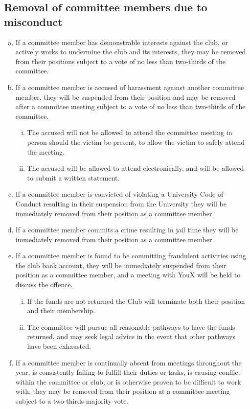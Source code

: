 \documentclass[11pt]{article}
\begin{document}
\subsection{Removal of committee members due to misconduct}
\begin{enumerate}[(a)]
    \item If a committee member has demonstrable interests against the club, or actively works to undermine the club and its interests, they may be removed from their positions subject to a vote of no less than two-thirds of the committee.
    \item If a committee member is accused of harassment against another committee member, they will be suspended from their position and may be removed after a committee meeting subject to a vote of no less than two-thirds of the committee. 
    \begin{enumerate}[(i)]
        \item The accused will not be allowed to attend the committee meeting in person should the victim be present, to allow the victim to safely attend the meeting.
        \item The accused will be allowed to attend electronically, and will be allowed to submit a written statement.
    \end{enumerate}  
    \item If a committee member is convicted of violating a University Code of Conduct resulting in their suspension from the University they will be immediately removed from their position as a committee member.
    \item If a committee member commits a crime resulting in jail time they will be immediately removed from their position as a committee member.
    \item If a committee member is found to be committing fraudulent activities using the club bank account, they will be immediately suspended from their position as a committee member, and a meeting with YouX will be held to discuss the offence.
    \begin{enumerate}[(i)]
        \item If the funds are not returned the Club will terminate both their position and their membership.
        \item The committee will pursue all reasonable pathways to have the funds returned, and may seek legal advice in the event that other pathways have been exhausted.
    \end{enumerate}
    \item If a committee member is continually absent from meetings throughout the year, is consistently failing to fulfill their duties or tasks, is causing conflict within the committee or club, or is otherwise proven to be difficult to work with, they may be removed from their position at a committee meeting subject to a two-thirds majority vote.
\end{enumerate}
\end{document}
